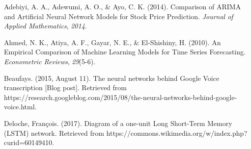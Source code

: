 \documentclass[11pt, oneside]{article}
\begin{document}
\begin{thebibliography}{9}








  Adebiyi, A. A., Adewumi, A. O., \& Ayo, C. K. (2014). Comparison of ARIMA and Artificial Neural Network Models for Stock Price Prediction. \textit{Journal of Applied Mathematics}, \textit{2014}.

  Ahmed, N. K., Atiya, A. F., Gayar, N. E., \& El-Shishiny, H. (2010). An Empirical Comparison of Machine Learning Models for Time Series Forecasting. \textit{Econometric Reviews}, \textit{29}(5-6).

  Beaufays. (2015, August 11). The neural networks behind Google Voice transcription [Blog post]. Retrieved from https://research.googleblog.com/2015/08/the-neural-networks-behind-google-voice.html.

  Deloche, Fran\c{c}ois. (2017). Diagram of a one-unit Long Short-Term Memory (LSTM) network. Retrieved from https://commons.wikimedia.org/w/index.php?curid=60149410.

\end{thebibliography}
\end{document}
